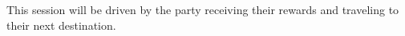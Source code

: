 This session will be driven by the party receiving their rewards and traveling to their next destination.